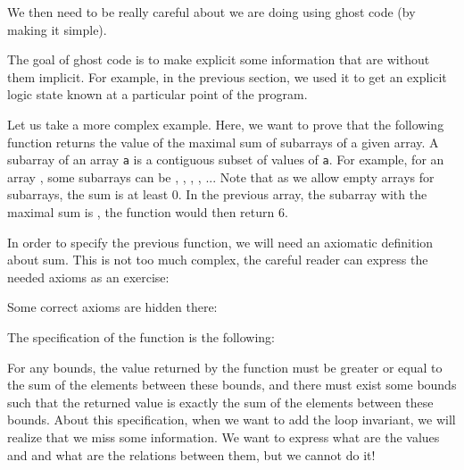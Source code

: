 We then need to be really careful about we are doing using ghost code
(by making it simple).





The goal of ghost code is to make explicit some information that are
without them implicit. For example, in the previous section, we used it
to get an explicit logic state known at a particular point of the
program.

Let us take a more complex example. Here, we want to prove that the
following function returns the value of the maximal sum of subarrays of
a given array. A subarray of an array \texttt{a} is a contiguous subset
of values of \texttt{a}. For example, for an array ,
some subarrays can be
\CodeInline{\{\}}, , 
, , ... Note that as we allow
empty arrays for subarrays, the sum is at least 0. In the previous
array, the subarray with the maximal sum is ,
the function would then return 6.






In order to specify the previous function, we will need an axiomatic
definition about sum. This is not too much complex, the careful reader
can express the needed axioms as an exercise:






Some correct axioms are hidden there:



\begin{Spoiler}
\end{Spoiler}


The specification of the function is the following:






For any bounds, the value returned by the function must be greater or
equal to the sum of the elements between these bounds, and there must
exist some bounds such that the returned value is exactly the sum of the
elements between these bounds. About this specification, when we want to
add the loop invariant, we will realize that we miss some information.
We want to express what are the values  and  and
what are the relations between them, but we cannot do it!

